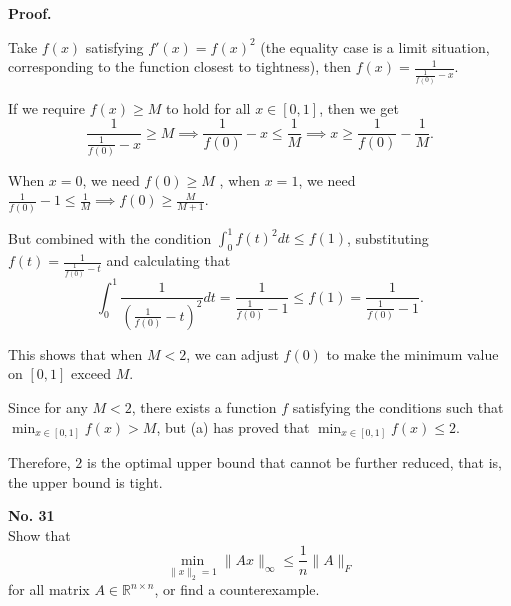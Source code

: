 \documentclass[a4paper, 11pt]{article}
\newenvironment{problem}[2][No.]
    { \begin{mdframed}[backgroundcolor=gray!5] \textbf{#1 #2} \\}
    {  \end{mdframed}}
\newenvironment{solution}
    {\textbf{Proof.}}
    {}
\begin{document}
\begin{solution}
\begin{enumerate}
	Take \( f(x) \) satisfying \( f'(x)=f(x)^2 \) (the equality case is a limit situation, corresponding to the function closest to tightness), then \( f(x)=\frac{1}{\frac{1}{f(0)}-x} \).
	
	If we require \( f(x) \geq M \) to hold for all \( x \in [0,1] \), then we get
	$$
	\frac{1}{\frac{1}{f(0)}-x} \geq M \implies \frac{1}{f(0)}-x \leq \frac{1}{M} \implies x \geq \frac{1}{f(0)} - \frac{1}{M}.
	$$
	
	When \( x = 0 \), we need \( f(0) \geq M \) , when \( x = 1 \), we need \( \frac{1}{f(0)} - 1 \leq \frac{1}{M} \implies f(0) \geq \frac{M}{M + 1} \).
	
	But combined with the condition \( \int_{0}^{1} f(t)^2 dt \leq f(1) \), substituting \( f(t)=\frac{1}{\frac{1}{f(0)}-t} \) and calculating that
	$$
	\int_{0}^{1} \frac{1}{\left( \frac{1}{f(0)} - t \right)^2} dt = \frac{1}{\frac{1}{f(0)} - 1} \leq f(1)=\frac{1}{\frac{1}{f(0)} - 1}.
	$$
	
	This shows that when \( M < 2 \), we can adjust \( f(0) \) to make the minimum value on \( [0,1] \) exceed \( M \).
	
	Since for any \( M < 2 \), there exists a function \( f \) satisfying the conditions such that \( \min_{x \in [0,1]} f(x) > M \), but (a) has proved that \( \min_{x \in [0,1]} f(x) \leq 2 \). 
	
	Therefore, \( 2 \) is the optimal upper bound that cannot be further reduced, that is, the upper bound is tight.
	
	\end{enumerate}
\end{solution}

\begin{problem}{31}
	Show that
	$$
	\min_{\|x\|_2 = 1} \|Ax\|_\infty \leq \frac{1}{n} \|A\|_F
	$$
	for all matrix \( A \in \mathbb{R}^{n \times n} \), or find a counterexample.
\end{problem}
\end{document}

